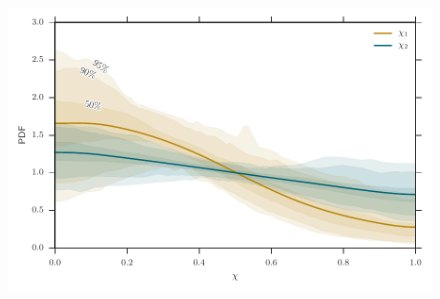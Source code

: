 \documentclass[iop,apj,twocolumn,twocolappendix,numberedappendix]{emulateapj}
\begin{document}


\begin{figure}
  \centering
  \includegraphics[width=0.95\columnwidth]{figures/spin_cred_regions/spin_cred_regions}
  \caption{\protect} 
\end{figure}


\end{document}
